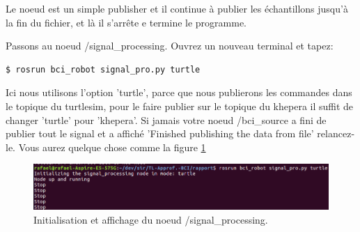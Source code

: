 Le noeud est un simple publisher et il continue à publier les échantillons jusqu'à la fin du fichier, et là il s'arrête e termine le programme.

Passons au noeud /signal\_processing. Ouvrez un nouveau terminal et tapez:

\begin{lstlisting}[language=bash]
  $ rosrun bci_robot signal_pro.py turtle
\end{lstlisting}

Ici nous utilisons l'option 'turtle', parce que nous publierons les commandes dans le topique du turtlesim, pour le faire publier sur le topique du khepera il suffit de changer 'turtle' pour 'khepera'. Si jamais votre noeud /bci\_source a fini de publier tout le signal et a affiché 'Finished publishing the data from file' relancez-le. Vous aurez quelque chose comme la figure \ref{fig:bci3}

\begin{figure}[!h]
  \centering
	\includegraphics[scale=0.50]{bci3.png}
	\caption{Initialisation et affichage du noeud /signal\_processing.}
	\label{fig:bci3}
\end{figure}

